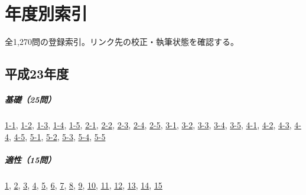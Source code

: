\chapter{年度別索引}
全1,270問の登録索引。リンク先の校正・執筆状態を確認する。
\section{平成23年度}
\paragraph{基礎（25問）} \hyperref[q:h23-reg-basic-1-1]{1-1}, \hyperref[q:h23-reg-basic-1-2]{1-2}, \hyperref[q:h23-reg-basic-1-3]{1-3}, \hyperref[q:h23-reg-basic-1-4]{1-4}, \hyperref[q:h23-reg-basic-1-5]{1-5}, \hyperref[q:h23-reg-basic-2-1]{2-1}, \hyperref[q:h23-reg-basic-2-2]{2-2}, \hyperref[q:h23-reg-basic-2-3]{2-3}, \hyperref[q:h23-reg-basic-2-4]{2-4}, \hyperref[q:h23-reg-basic-2-5]{2-5}, \hyperref[q:h23-reg-basic-3-1]{3-1}, \hyperref[q:h23-reg-basic-3-2]{3-2}, \hyperref[q:h23-reg-basic-3-3]{3-3}, \hyperref[q:h23-reg-basic-3-4]{3-4}, \hyperref[q:h23-reg-basic-3-5]{3-5}, \hyperref[q:h23-reg-basic-4-1]{4-1}, \hyperref[q:h23-reg-basic-4-2]{4-2}, \hyperref[q:h23-reg-basic-4-3]{4-3}, \hyperref[q:h23-reg-basic-4-4]{4-4}, \hyperref[q:h23-reg-basic-4-5]{4-5}, \hyperref[q:h23-reg-basic-5-1]{5-1}, \hyperref[q:h23-reg-basic-5-2]{5-2}, \hyperref[q:h23-reg-basic-5-3]{5-3}, \hyperref[q:h23-reg-basic-5-4]{5-4}, \hyperref[q:h23-reg-basic-5-5]{5-5}
\paragraph{適性（15問）} \hyperref[q:h23-reg-apt-01]{1}, \hyperref[q:h23-reg-apt-02]{2}, \hyperref[q:h23-reg-apt-03]{3}, \hyperref[q:h23-reg-apt-04]{4}, \hyperref[q:h23-reg-apt-05]{5}, \hyperref[q:h23-reg-apt-06]{6}, \hyperref[q:h23-reg-apt-07]{7}, \hyperref[q:h23-reg-apt-08]{8}, \hyperref[q:h23-reg-apt-09]{9}, \hyperref[q:h23-reg-apt-10]{10}, \hyperref[q:h23-reg-apt-11]{11}, \hyperref[q:h23-reg-apt-12]{12}, \hyperref[q:h23-reg-apt-13]{13}, \hyperref[q:h23-reg-apt-14]{14}, \hyperref[q:h23-reg-apt-15]{15}
